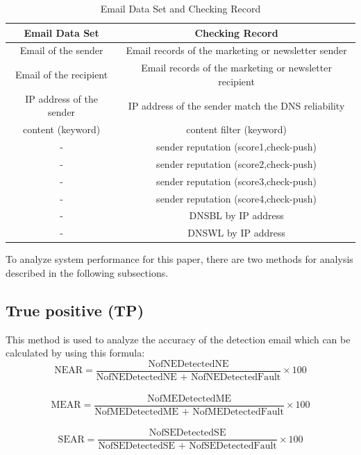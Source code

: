 \documentclass[conference]{IEEEtran}
\begin{document}
\begin{table}[!t]
\renewcommand{\arraystretch}{1.2}
\caption{Email Data Set and Checking Record}
\label{table_emailDataset_checkRecord}
\centering
\begin{tabular}{c|c}
\hline
\bfseries Email Data Set & \bfseries Checking Record\\
\hline
Email of the sender & Email records of the marketing or newsletter sender\\
\hline
Email of the recipient & Email records of the marketing or newsletter recipient\\
\hline
IP address of the sender & IP address of the sender match the DNS reliability\\
\hline
content (keyword) & content filter (keyword)\\ 
\hline
- & sender reputation (score1,check-push) \\
\hline
- & sender reputation (score2,check-push) \\
\hline
- & sender reputation (score3,check-push) \\
\hline
- & sender reputation (score4,check-push) \\
\hline
- & DNSBL by IP address \\
\hline
- & DNSWL by IP address\\
\hline
\end{tabular}
\end{table}

To analyze system performance for this paper, there are two methods for analysis described in the following subsections.

\subsection{True positive (TP)}
This method is used to analyze the accuracy of the detection email which can be calculated by using this formula:\\
$$ \text{NEAR} =  \frac{\text{NofNEDetectedNE}}{\text{NofNEDetectedNE + NofNEDetectedFault}} \times 100 $$\\
$$ \text{MEAR} =  \frac{\text{NofMEDetectedME}}{\text{NofMEDetectedME + NofMEDetectedFault}} \times 100 $$\\
$$ \text{SEAR} =  \frac{\text{NofSEDetectedSE}}{\text{NofSEDetectedSE + NofSEDetectedFault}} \times 100 $$\\
\end{document}
